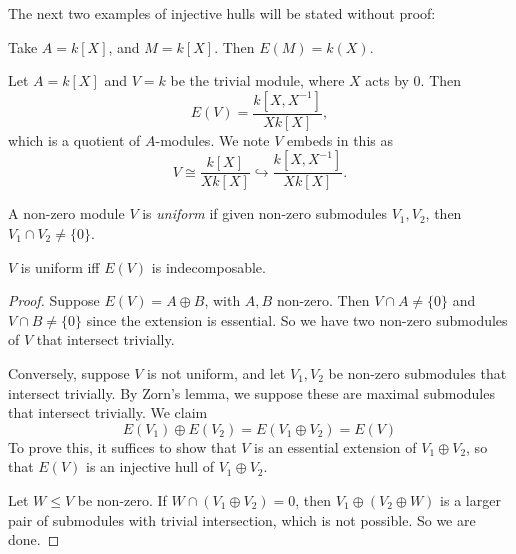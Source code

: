 \documentclass[a4paper]{article}
\begin{document}
The next two examples of injective hulls will be stated without proof: %
\begin{eg}
  Take $A = k[X]$, and $M = k[X]$. Then $E(M) = k(X)$.
\end{eg}

\begin{eg}
  Let $A = k[X]$ and $V = k$ be the trivial module, where $X$ acts by $0$. Then
  \[
    E(V) = \frac{k[X, X^{-1}]}{X k[X]},
  \]
  which is a quotient of $A$-modules. We note $V$ embeds in this as
  \[
    V \cong \frac{k[X]}{X k[X]} \hookrightarrow \frac{k[X, X^{-1}]}{X k[X]}.
  \]
\end{eg}

%
%

\begin{defi}
  A non-zero module $V$ is \emph{uniform} if given non-zero submodules $V_1, V_2$, then $V_1 \cap V_2 \not= \{0\}$.
\end{defi}

\begin{lemma}
  $V$ is uniform iff $E(V)$ is indecomposable.
\end{lemma}

\begin{proof}
  Suppose $E(V) = A \oplus B$, with $A, B$ non-zero. Then $V \cap A \not= \{0\}$ and $V \cap B \not= \{0\}$ since the extension is essential. So we have two non-zero submodules of $V$ that intersect trivially.

  Conversely, suppose $V$ is not uniform, and let $V_1, V_2$ be non-zero submodules that intersect trivially. By Zorn's lemma, we suppose these are maximal submodules that intersect trivially. We claim
  \[
    E(V_1) \oplus E(V_2) = E(V_1 \oplus V_2) = E(V)
  \]
  To prove this, it suffices to show that $V$ is an essential extension of $V_1 \oplus V_2$, so that $E(V)$ is an injective hull of $V_1 \oplus V_2$.

  Let $W \leq V$ be non-zero. If $W \cap (V_1 \oplus V_2) = 0$, then $V_1 \oplus (V_2 \oplus W)$ is a larger pair of submodules with trivial intersection, which is not possible. So we are done.
\end{proof}
\end{document}
